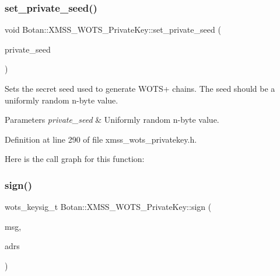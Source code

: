 \subsubsection{\texorpdfstring{set\+\_\+private\+\_\+seed()}{set\_private\_seed()}\hspace{0.1cm}{\footnotesize\ttfamily [2/2]}}
{\footnotesize\ttfamily void Botan\+::\+X\+M\+S\+S\+\_\+\+W\+O\+T\+S\+\_\+\+Private\+Key\+::set\+\_\+private\+\_\+seed (\begin{DoxyParamCaption}\item[{secure\+\_\+vector$<$ uint8\+\_\+t $>$ \&\&}]{private\+\_\+seed }\end{DoxyParamCaption})\hspace{0.3cm}{\ttfamily [inline]}}

Sets the secret seed used to generate W\+O\+T\+S+ chains. The seed should be a uniformly random n-\/byte value.


\begin{DoxyParams}{Parameters}
{\em private\+\_\+seed} & Uniformly random n-\/byte value. \\
\hline
\end{DoxyParams}


Definition at line 290 of file xmss\+\_\+wots\+\_\+privatekey.\+h.

Here is the call graph for this function\+:
\mbox{\label{class_botan_1_1_x_m_s_s___w_o_t_s___private_key_a8a392d55b4494010566455cf12c37e6c}} 
\subsubsection{\texorpdfstring{sign()}{sign()}\hspace{0.1cm}{\footnotesize\ttfamily [1/2]}}
{\footnotesize\ttfamily wots\+\_\+keysig\+\_\+t Botan\+::\+X\+M\+S\+S\+\_\+\+W\+O\+T\+S\+\_\+\+Private\+Key\+::sign (\begin{DoxyParamCaption}\item[{const secure\+\_\+vector$<$ uint8\+\_\+t $>$ \&}]{msg,  }\item[{\mbox{\hyperlink{class_botan_1_1_x_m_s_s___address}{X\+M\+S\+S\+\_\+\+Address}} \&}]{adrs }\end{DoxyParamCaption})\hspace{0.3cm}{\ttfamily [inline]}}

